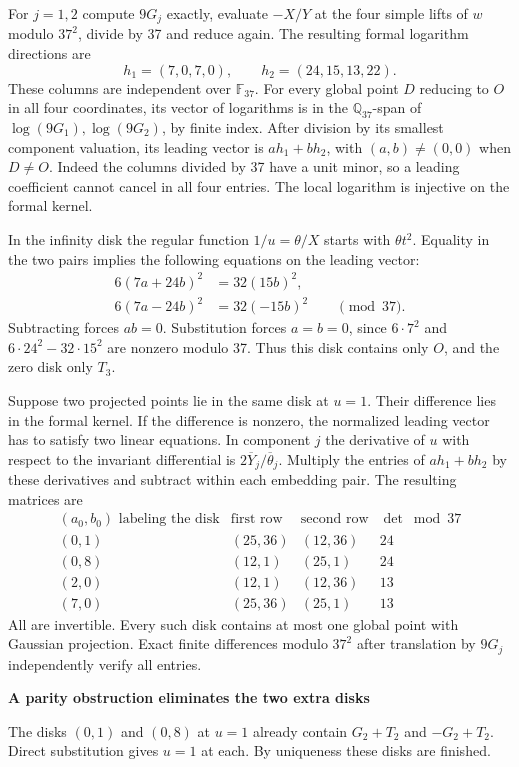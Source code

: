 \documentclass[12pt]{article}
\newcommand{\Q}{\mathbb Q}\newcommand{\Z}{\mathbb Z}\newcommand{\F}{\mathbb F}
\newcommand{\head}[1]{{\Large\bfseries\color{ink}#1}\par\smallskip}
\begin{document}
For $j=1,2$ compute $9G_j$ exactly, evaluate $-X/Y$ at the four simple lifts of $w$ modulo $37^2$, divide by 37 and reduce again. The resulting formal logarithm directions are
\[
 h_1=(7,0,7,0),\qquad h_2=(24,15,13,22).
\]
These columns are independent over $\F_{37}$. For every global point $D$ reducing to $O$ in all four coordinates, its vector of logarithms is in the $\Q_{37}$-span of $\log(9G_1),\log(9G_2)$, by finite index. After division by its smallest component valuation, its leading vector is $a h_1+b h_2$, with $(a,b)\ne(0,0)$ when $D\ne O$. Indeed the columns divided by 37 have a unit minor, so a leading coefficient cannot cancel in all four entries. The local logarithm is injective on the formal kernel.

In the infinity disk the regular function $1/u=\theta/X$ starts with $\theta t^2$. Equality in the two pairs implies the following equations on the leading vector:
\[
\begin{aligned}
6(7a+24b)^2&=32(15b)^2,\\
6(7a-24b)^2&=32(-15b)^2\qquad\pmod{37}.
\end{aligned}
\]
Subtracting forces $ab=0$. Substitution forces $a=b=0$, since $6\cdot7^2$ and $6\cdot24^2-32\cdot15^2$ are nonzero modulo 37. Thus this disk contains only $O$, and the zero disk only $T_3$.

Suppose two projected points lie in the same disk at $u=1$. Their difference lies in the formal kernel. If the difference is nonzero, the normalized leading vector has to satisfy two linear equations. In component $j$ the derivative of $u$ with respect to the invariant differential is $2\overline Y_j/\overline\theta_j$. Multiply the entries of $ah_1+bh_2$ by these derivatives and subtract within each embedding pair. The resulting matrices are
\[
\begin{array}{c|cc|c}
 (a_0,b_0)\text{ labeling the disk}&\text{first row}&\text{second row}&\det\bmod37\\ \hline
(0,1)&(25,36)&(12,36)&24\\
(0,8)&(12,1)&(25,1)&24\\
(2,0)&(12,1)&(12,36)&13\\
(7,0)&(25,36)&(25,1)&13
\end{array}
\]
All are invertible. Every such disk contains at most one global point with Gaussian projection. Exact finite differences modulo $37^2$ after translation by $9G_j$ independently verify all entries.

\newpage
\head{A parity obstruction eliminates the two extra disks}
The disks $(0,1)$ and $(0,8)$ at $u=1$ already contain $G_2+T_2$ and $-G_2+T_2$. Direct substitution gives $u=1$ at each. By uniqueness these disks are finished.
\end{document}

